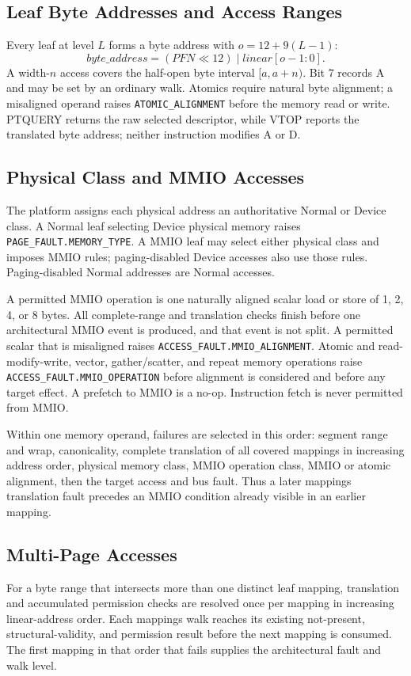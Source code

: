 \subsection{Leaf Byte Addresses and Access Ranges}
Every leaf at level $L$ forms a byte address with $o=12+9(L-1)$:
\[
  \mathit{byte\_address} = (\mathit{PFN}\ll12)\mathbin{|}\mathit{linear}[o-1:0].
\]
A width-$n$ access covers the half-open byte interval $[a,a+n)$. Bit 7 records A and may be set by an ordinary walk.
Atomics require natural byte alignment; a misaligned operand raises \texttt{ATOMIC\_ALIGNMENT} before the memory
read or write. PTQUERY returns the raw selected descriptor, while VTOP reports the translated byte address; neither
instruction modifies A or D.

\subsection{Physical Class and MMIO Accesses}
The platform assigns each physical address an authoritative Normal or Device
class. A Normal leaf selecting Device physical memory raises
\texttt{PAGE\_FAULT.MEMORY\_TYPE}. A MMIO leaf may select either physical
class and imposes MMIO rules; paging-disabled Device accesses also use those
rules. Paging-disabled Normal addresses are Normal accesses.

A permitted MMIO operation is one naturally aligned scalar load or store of
1, 2, 4, or 8 bytes. All complete-range and translation checks finish before
one architectural MMIO event is produced, and that event is not split. A
permitted scalar that is misaligned raises
\texttt{ACCESS\_FAULT.MMIO\_ALIGNMENT}. Atomic and read-modify-write, vector,
gather/scatter, and repeat memory operations raise
\texttt{ACCESS\_FAULT.MMIO\_OPERATION} before alignment is considered and
before any target effect. A prefetch to MMIO is a no-op. Instruction fetch is
never permitted from MMIO.

Within one memory operand, failures are selected in this order: segment range
and wrap, canonicality, complete translation of all covered mappings in
increasing address order, physical memory class, MMIO operation class, MMIO or
atomic alignment, then the target access and bus fault. Thus a later mapping\textquotesingle{}s
translation fault precedes an MMIO condition already visible in an earlier
mapping.

\subsection{Multi-Page Accesses}
For a byte range that intersects more than one distinct leaf mapping, translation and accumulated permission checks
are resolved once per mapping in increasing linear-address order. Each
mapping\textquotesingle{}s walk reaches its existing not-present, structural-validity, and permission result before the next mapping
is consumed. The first mapping in that order that fails supplies the architectural fault and walk level.

